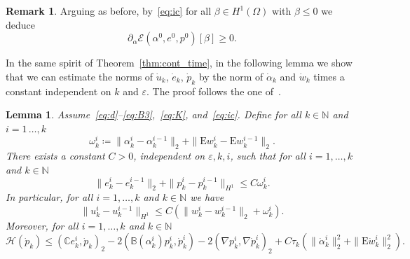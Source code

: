\documentclass[reqno]{amsart}
\newtheorem{lemma}[corollary]{Lemma}
\theoremstyle{definition}
\newtheorem{remark}[corollary]{Remark}
\numberwithin{equation}{section}
\def\N {\mathbb N}
\def\C {\mathbb C}
\def\B {\mathbb B}
\def\EE {\mathrm{E}}
\begin{document}
\begin{remark}
Arguing as before, by~\eqref{eq:ic} for all $\beta\in H^1(\Omega)$ with $\beta\le 0$ we deduce
\begin{equation}\label{eq:st_ak0}
\partial_\alpha\mathcal E(\alpha^0,e^0,p^0)[\beta]\ge 0.
\end{equation}
\end{remark}

In the same spirit of Theorem~\ref{thm:cont_time}, in the following lemma we show that we can estimate the norms of $\dot u_k$, $\dot e_k$, $\dot p_k$  by the norm of  $\dot \alpha_k$ and $\dot w_k$ times a constant independent on $k$ and $\varepsilon$. The proof follows the one of~\cite[Lemma 3.6]{CrLa}.

\begin{lemma}\label{lem:ki_est}
Assume~\eqref{eq:d}--\eqref{eq:B3},~\eqref{eq:K}, and~\eqref{eq:ic}. Define for all $k\in\N$ and $i=1\,\dots,k$
\begin{equation*}
\omega_k^i\coloneqq \|\alpha_k^i-\alpha_k^{i-1}\|_2+\|\EE w_k^i-\EE w_k^{i-1}\|_2.
\end{equation*}
There exists a constant $C>0$, independent on $\varepsilon,k,i$, such that for all $i=1,\dots,k$ and $k\in\N$
\begin{equation}\label{eq:ekikiwki}
\|e_k^i-e_k^{i-1}\|_2+\|p_k^i-p_k^{i-1}\|_{H^1}\le C\omega_k^i.
\end{equation}
In particular, for all $i=1,\dots,k$ and $k\in\N$ we have
\begin{equation}\label{eq:ukiwki}
\|u_k^i-u_k^{i-1}\|_{H^1}\le C(\|w_k^i-w_k^{i-1}\|_2+\omega_k^i).
\end{equation}
Moreover, for all $i=1,\dots,k$ and $k\in\N$
\begin{equation}\label{eq:Hdotpk}
\mathcal H(\dot p_k)\le (\C e_k^i,\dot p_k)_2-2(\B(\alpha_k^i)p_k^i,\dot p_k^i)-2(\nabla p_k^i,\nabla\dot p_k^i)_2+C\tau_k\left(\|\dot\alpha_k^i\|_2^2+\|\EE \dot w_k^i\|_2^2\right).
\end{equation}
\end{lemma}
\end{document}
